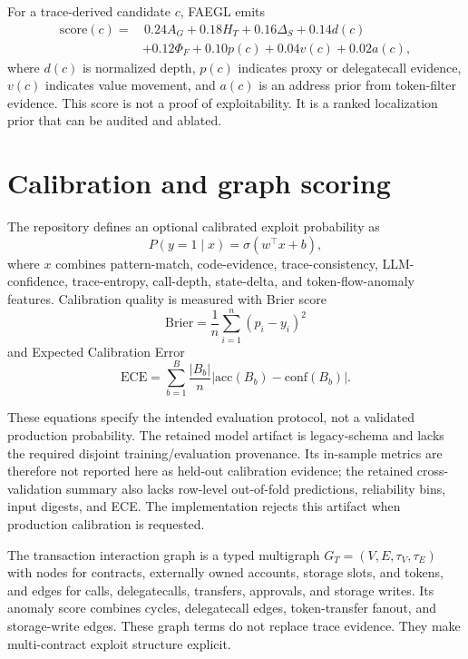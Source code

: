 \documentclass[conference]{IEEEtran}
\begin{document}
For a trace-derived candidate $c$, FAEGL emits
\begin{align}
\mathrm{score}(c)=&\,0.24A_G+0.18H_T+0.16\Delta_S+0.14d(c) \nonumber\\
&+0.12\Phi_F+0.10p(c)+0.04v(c)+0.02a(c),
\end{align}
where $d(c)$ is normalized depth, $p(c)$ indicates proxy or delegatecall evidence, $v(c)$ indicates value movement, and $a(c)$ is an address prior from token-filter evidence. This score is not a proof of exploitability. It is a ranked localization prior that can be audited and ablated.

\section{Calibration and graph scoring}

The repository defines an optional calibrated exploit probability as
\begin{equation}
P(y=1\mid x)=\sigma(w^\top x+b),
\end{equation}
where $x$ combines pattern-match, code-evidence, trace-consistency, LLM-confidence, trace-entropy, call-depth, state-delta, and token-flow-anomaly features. Calibration quality is measured with Brier score
\begin{equation}
\mathrm{Brier}=\frac{1}{n}\sum_{i=1}^{n}(p_i-y_i)^2
\end{equation}
and Expected Calibration Error
\begin{equation}
\mathrm{ECE}=\sum_{b=1}^{B}\frac{|B_b|}{n}\left|\mathrm{acc}(B_b)-\mathrm{conf}(B_b)\right|.
\end{equation}

These equations specify the intended evaluation protocol, not a validated
production probability. The retained model artifact is legacy-schema and lacks
the required disjoint training/evaluation provenance. Its in-sample metrics are
therefore not reported here as held-out calibration evidence; the retained
cross-validation summary also lacks row-level out-of-fold predictions,
reliability bins, input digests, and ECE. The implementation rejects this
artifact when production calibration is requested.

The transaction interaction graph is a typed multigraph $G_T=(V,E,\tau_V,\tau_E)$ with nodes for contracts, externally owned accounts, storage slots, and tokens, and edges for calls, delegatecalls, transfers, approvals, and storage writes. Its anomaly score combines cycles, delegatecall edges, token-transfer fanout, and storage-write edges. These graph terms do not replace trace evidence. They make multi-contract exploit structure explicit.
\end{document}

